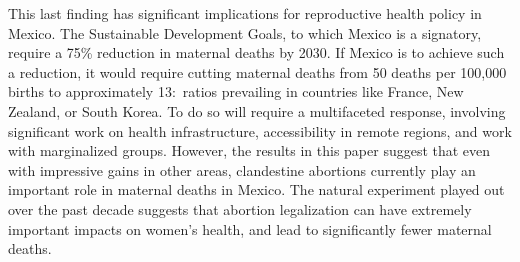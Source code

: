 \documentclass[a4paper, 11pt]{article}
\begin{document}
\begin{spacing}{2}
This last finding has significant implications for reproductive health policy in Mexico.  The Sustainable Development Goals, to which Mexico is a signatory, require a 75\% reduction in maternal deaths by 2030.  If Mexico is to achieve such a reduction, it would require cutting maternal deaths from 50 deaths per 100,000 births to approximately 13:\ ratios prevailing in countries like France, New Zealand, or South Korea. %
To do so will require a multifaceted response, involving significant work on health infrastructure, accessibility in remote regions, and work with marginalized groups.  However, the results in this paper suggest that even with impressive gains in other areas, clandestine abortions currently play an important role in maternal deaths in Mexico.  The natural experiment played out over the past decade suggests that abortion legalization can have extremely important impacts on women's health, and lead to significantly fewer maternal deaths.
\end{spacing}
\newpage


\end{document}
